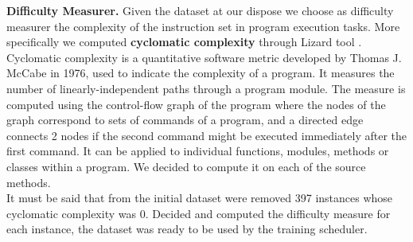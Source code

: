 

\noindent\textbf{Difficulty Measurer.} Given the dataset at our dispose we choose as difficulty measurer the 
complexity of the instruction set in program execution tasks. More specifically we 
computed \textbf{cyclomatic complexity} through Lizard tool \cite{lizard}. Cyclomatic complexity
is a quantitative software metric developed by Thomas J. McCabe in 1976, used to indicate
the complexity of a program.  
It measures the number of linearly-independent paths through a program module. 
The measure is computed using the control-flow graph of the program where
the nodes of the graph correspond to sets of commands of a program, and
a directed edge connects 2 nodes if the second command might be executed
immediately after the first command. It can be applied to individual functions,
modules, methods or classes within a program. We decided to compute it on each of
the source methods.\\
It must be said that from the initial dataset were removed 397 instances whose
cyclomatic complexity was 0. Decided and computed the difficulty measure
for each instance, the dataset was ready to be used by the training scheduler.\newline

